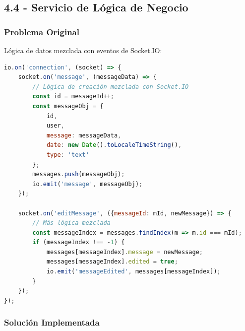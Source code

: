 \documentclass[12pt,a4paper]{article}
\begin{document}
\subsection{4.4 - Servicio de Lógica de Negocio}

\subsubsection{Problema Original}
Lógica de datos mezclada con eventos de Socket.IO:

\begin{lstlisting}[caption=Problema Original - Lógica Mixta, language=JavaScript]
io.on('connection', (socket) => {
    socket.on('message', (messageData) => {
        // Lógica de creación mezclada con Socket.IO
        const id = messageId++;
        const messageObj = {
            id,
            user,
            message: messageData,
            date: new Date().toLocaleTimeString(),
            type: 'text'
        };
        messages.push(messageObj);
        io.emit('message', messageObj);
    });

    socket.on('editMessage', ({messageId: mId, newMessage}) => {
        // Más lógica mezclada
        const messageIndex = messages.findIndex(m => m.id === mId);
        if (messageIndex !== -1) {
            messages[messageIndex].message = newMessage;
            messages[messageIndex].edited = true;
            io.emit('messageEdited', messages[messageIndex]);
        }
    });
});
\end{lstlisting}

\subsubsection{Solución Implementada}
\end{document}
